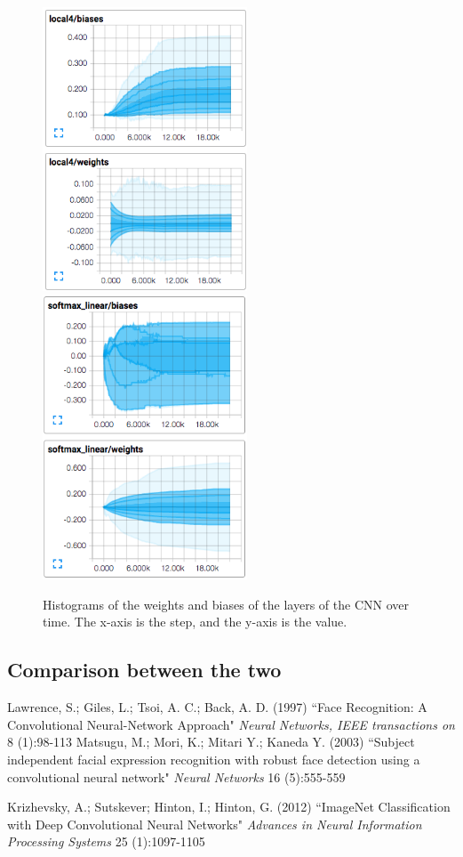 \documentclass[11pt, twocolumn, twoside]{article}
\begin{document}
\begin{figure}
	\includegraphics[width=2.4in]{local4_params}
	\includegraphics[width=2.4in]{softmax_params}
	\caption{Histograms of the weights and biases of the layers of the CNN over time. The x-axis is the step, and the y-axis is the value.}
	\label{fig:params}
\end{figure}

\subsection{Comparison between the two}


\begin{thebibliography}{9}
Lawrence, S.; Giles, L.; Tsoi, A. C.; Back, A. D. (1997)
``Face Recognition: A Convolutional Neural-Network Approach"
\textit{Neural Networks, IEEE transactions on} 8 (1):98-113
Matsugu, M.; Mori, K.; Mitari Y.; Kaneda Y. (2003)
``Subject independent facial expression recognition with robust face detection using a convolutional neural network"
\textit{Neural Networks} 16 (5):555-559


Krizhevsky, A.; Sutskever; Hinton, I.; Hinton, G. (2012)
``ImageNet Classification with Deep Convolutional Neural Networks"
\textit{Advances in Neural Information Processing Systems} 25 (1):1097-1105
\end{thebibliography}
\end{document}
